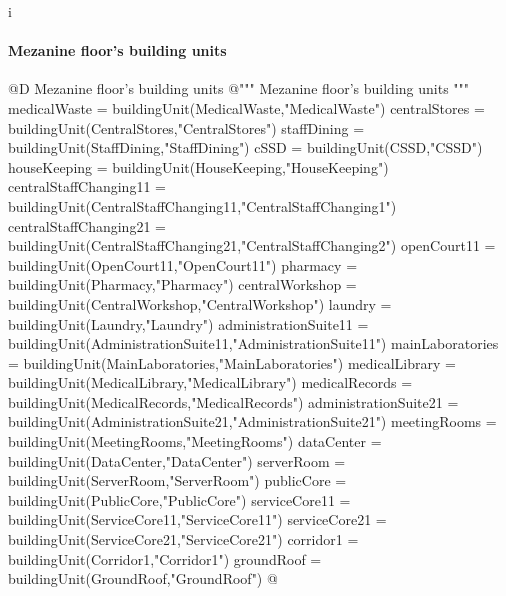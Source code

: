 i\documentclass[11pt,oneside]{article}    %
\begin{document}
\paragraph{Mezanine floor's building units}
@D Mezanine floor's building units 
@{""" Mezanine floor's building units """
medicalWaste = buildingUnit(MedicalWaste,"MedicalWaste")
centralStores = buildingUnit(CentralStores,"CentralStores")
staffDining = buildingUnit(StaffDining,"StaffDining")
cSSD = buildingUnit(CSSD,"CSSD")
houseKeeping = buildingUnit(HouseKeeping,"HouseKeeping")
centralStaffChanging11 = buildingUnit(CentralStaffChanging11,"CentralStaffChanging1")
centralStaffChanging21 = buildingUnit(CentralStaffChanging21,"CentralStaffChanging2")
openCourt11 = buildingUnit(OpenCourt11,"OpenCourt11") 
pharmacy = buildingUnit(Pharmacy,"Pharmacy")
centralWorkshop = buildingUnit(CentralWorkshop,"CentralWorkshop")
laundry = buildingUnit(Laundry,"Laundry")
administrationSuite11 = buildingUnit(AdministrationSuite11,"AdministrationSuite11")
mainLaboratories = buildingUnit(MainLaboratories,"MainLaboratories")
medicalLibrary = buildingUnit(MedicalLibrary,"MedicalLibrary")
medicalRecords = buildingUnit(MedicalRecords,"MedicalRecords")
administrationSuite21 = buildingUnit(AdministrationSuite21,"AdministrationSuite21")
meetingRooms = buildingUnit(MeetingRooms,"MeetingRooms")
dataCenter = buildingUnit(DataCenter,"DataCenter")
serverRoom = buildingUnit(ServerRoom,"ServerRoom")
publicCore = buildingUnit(PublicCore,"PublicCore")
serviceCore11 = buildingUnit(ServiceCore11,"ServiceCore11")
serviceCore21 = buildingUnit(ServiceCore21,"ServiceCore21")
corridor1 = buildingUnit(Corridor1,"Corridor1")
groundRoof = buildingUnit(GroundRoof,"GroundRoof")
@}
\end{document}
